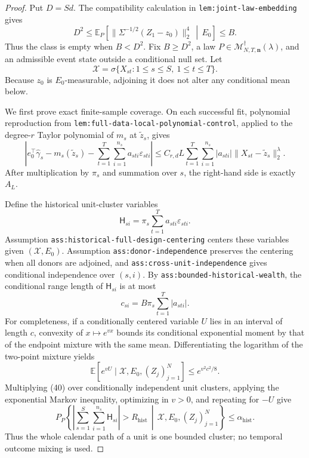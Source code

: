 \documentclass{article}
\begin{document}
\begin{proof}
Put \(D=Sd\).  The compatibility calculation in \texttt{lem:joint-law-embedding} gives
\[
D^2\leq
\mathbb E_P\!\left[
\|\Sigma^{-1/2}(Z_1-z_0)\|_2^4
\,\middle|\,E_0\right]
\leq B.
\tag{38}
\]
Thus the class is empty when \(B<D^2\).  Fix \(B\geq D^2\), a law
\(P\in\mathcal M_{N,T,\mathbf n}^{\dagger}(\lambda)\), and an admissible event state outside a conditional null set.  Let
\[
\mathscr X=\sigma\{X_{st}:1\leq s\leq S,\ 1\leq t\leq T\}.
\]
Because \(z_0\) is \(E_0\)-measurable, adjoining it does not alter any conditional mean below.

We first prove exact finite-sample coverage.  On each successful fit, polynomial reproduction from \texttt{lem:full-data-local-polynomial-control}, applied to the degree-\(r\) Taylor polynomial of \(m_s\) at \(\widetilde z_s\), gives
\[
\left|
e_0^\top\widehat\gamma_s-m_s(\widetilde z_s)
-\sum_{t=1}^{T}\sum_{i=1}^{n_s}a_{sti}\varepsilon_{sti}
\right|
\leq C_{r,d}L\sum_{t=1}^{T}\sum_{i=1}^{n_s}|a_{sti}|
\|X_{st}-\widetilde z_s\|_2^\lambda.
\tag{39}
\]
After multiplication by \(\pi_s\) and summation over \(s\), the right-hand side is exactly \(A_L\).

Define the historical unit-cluster variables
\[
\mathsf H_{si}=\pi_s\sum_{t=1}^{T}a_{sti}\varepsilon_{sti}.
\]
Assumption \texttt{ass:historical-full-design-centering} centers these variables given \((\mathscr X,E_0)\).  Assumption \texttt{ass:donor-independence} preserves the centering when all donors are adjoined, and \texttt{ass:cross-unit-independence} gives conditional independence over \((s,i)\).  By \texttt{ass:bounded-historical-wealth}, the conditional range length of \(\mathsf H_{si}\) is at most
\[
c_{si}=B\pi_s\sum_{t=1}^{T}|a_{sti}|.
\]
For completeness, if a conditionally centered variable \(U\) lies in an interval of length \(c\), convexity of \(x\mapsto e^{vx}\) bounds its conditional exponential moment by that of the endpoint mixture with the same mean.  Differentiating the logarithm of the two-point mixture yields
\[
\mathbb E[e^{vU}\mid\mathscr X,E_0,(Z_j)_{j=1}^{N}]
\leq e^{v^2c^2/8}.
\tag{40}
\]
Multiplying (40) over conditionally independent unit clusters, applying the exponential Markov inequality, optimizing in \(v>0\), and repeating for \(-U\) give
\[
P_P\!\left\{
\left|\sum_{s=1}^{S}\sum_{i=1}^{n_s}\mathsf H_{si}\right|
>R_{\mathrm{hist}}
\,\middle|\,\mathscr X,E_0,(Z_j)_{j=1}^{N}
\right\}
\leq\alpha_{\mathrm{hist}}.
\tag{41}
\]
Thus the whole calendar path of a unit is one bounded cluster; no temporal outcome mixing is used.


\end{proof}
\end{document}
